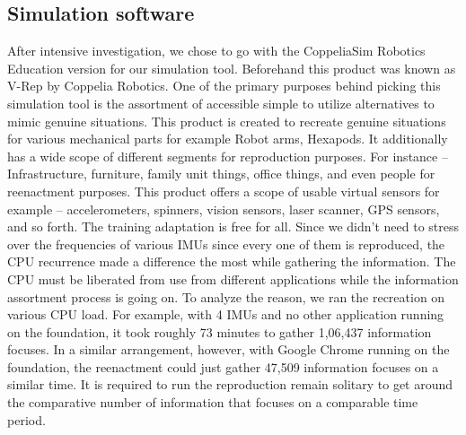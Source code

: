 \subsection{Simulation software}
After intensive investigation, we chose to go with the CoppeliaSim Robotics Education version for our simulation tool. Beforehand this product was known as V-Rep by Coppelia Robotics. One of the primary purposes behind picking this simulation tool is the assortment of accessible simple to utilize alternatives to mimic genuine situations. This product is created to recreate genuine situations for various mechanical parts for example Robot arms, Hexapods. It additionally has a wide scope of different segments for reproduction purposes. For instance – Infrastructure, furniture, family unit things, office things, and even people for reenactment purposes. This product offers a scope of usable virtual sensors for example – accelerometers, spinners, vision sensors, laser scanner, GPS sensors, and so forth. The training adaptation is free for all. Since we didn't need to stress over the frequencies of various IMUs since every one of them is reproduced, the CPU recurrence made a difference the most while gathering the information. The CPU must be liberated from use from different applications while the information assortment process is going on. To analyze the reason, we ran the recreation on various CPU load. For example, with 4 IMUs and no other application running on the foundation, it took roughly 73 minutes to gather 1,06,437 information focuses. In a similar arrangement, however, with Google Chrome running on the foundation, the reenactment could just gather 47,509 information focuses on a similar time. It is required to run the reproduction remain solitary to get around the comparative number of information that focuses on a comparable time period.
